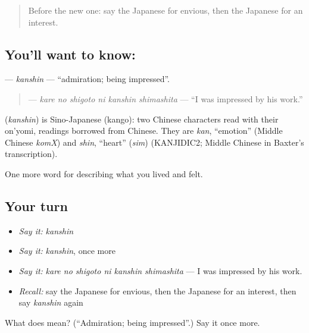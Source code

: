 \label{lesson:JA-C433-kanshin}



\begin{quote}
Before the new one: say the Japanese for envious, then the Japanese for an interest.
\end{quote}

\subsection*{You'll want to know: }
\textbf{} — \emph{kanshin} — \textquotedblleft{}admiration; being impressed\textquotedblright{}.

\begin{quote}
\textbf{  } — \emph{kare no shigoto ni kanshin shimashita} — \textquotedblleft{}I was impressed by his work.\textquotedblright{}
\end{quote}

\begin{cousinweb}
\textbf{} (\emph{kanshin}) is Sino-Japanese (kango): two Chinese characters read with their on'yomi, readings borrowed from Chinese. They are \emph{kan}, \textquotedblleft{}emotion\textquotedblright{} (Middle Chinese \emph{komX}) and \emph{shin}, \textquotedblleft{}heart\textquotedblright{} (\emph{sim}) (KANJIDIC2; Middle Chinese in Baxter's transcription).
\end{cousinweb}

\begin{grammarlens}[title={What you've built}]
One more word for describing what you lived and felt.
\end{grammarlens}

\subsection*{Your turn}
\begin{itemize}
\raggedright
  \item \emph{Say it:} \emph{kanshin}
  \item \emph{Say it:} \emph{kanshin}, once more
  \item \emph{Say it:} \emph{kare no shigoto ni kanshin shimashita} — I was impressed by his work.
  \item \emph{Recall:} say the Japanese for envious, then the Japanese for an interest, then say \emph{kanshin} again
\end{itemize}

\begin{tcolorbox}[breakable,colback=teal!4,colframe=teal!35!black,title={Before you move on}]
What does  mean? (\textquotedblleft{}Admiration; being impressed\textquotedblright{}.) Say it once more.
\end{tcolorbox}
